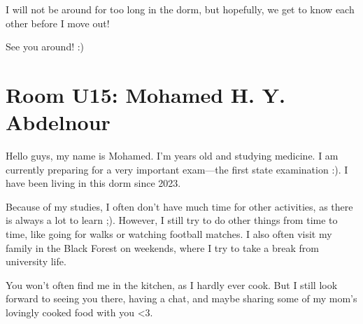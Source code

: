 I will not be around for too long in the dorm, but hopefully, we get to know each other before I move out!

See you around! :)

\section{Room U15: Mohamed H. Y. Abdelnour} \label{sec:mohamedA}
%
\FPsub\result{\theCurrentDate}{\theBirthdate}
\FPdiv{}
\FPtrunc{}

Hello guys, my name is Mohamed. I’m \myage{} years old and studying medicine. I am currently preparing for a very important exam—the first state examination :). I have been living in this dorm since 2023.

Because of my studies, I often don’t have much time for other activities, as there is always a lot to learn ;). However, I still try to do other things from time to time, like going for walks or watching football matches. I also often visit my family in the Black Forest on weekends, where I try to take a break from university life.

You won’t often find me in the kitchen, as I hardly ever cook. But I still look forward to seeing you there, having a chat, and maybe sharing some of my mom’s lovingly cooked food with you <3.
